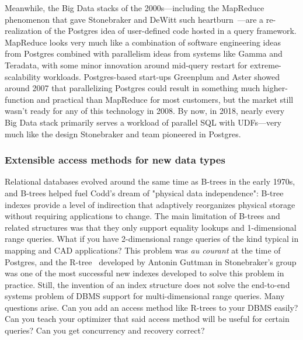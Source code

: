 \documentclass[sigconf,natbib=false]{acmart}
\begin{document}
Meanwhile, the Big Data stacks of the 2000s---including the MapReduce phenomenon that gave Stonebraker and DeWitt such heartburn~\cite{dewitt2008mapreduce}---are a re-realization of the Postgres idea of user-defined code hosted in a query framework. MapReduce looks very much like a combination of software engineering ideas from Postgres combined with parallelism ideas from systems like Gamma and Teradata, with some minor innovation around mid-query restart for extreme-scalability workloads. Postgres-based start-ups Greenplum and Aster showed around 2007 that parallelizing Postgres could result in something much higher-function and practical than MapReduce for most customers, but the market still wasn't ready for any of this technology in 2008. By now, in 2018, nearly every Big Data stack primarily serves a workload of parallel SQL with UDFs---very much like the design Stonebraker and team pioneered in Postgres.

\subsubsection{Extensible access methods for new data types}



Relational databases evolved around the same time as B-trees in the early 1970s, and B-trees helped fuel Codd's dream of "physical data independence": B-tree indexes provide a level of indirection that adaptively reorganizes physical storage without requiring applications to change. The main limitation of B-trees and related structures was that they only support equality lookups and 1-dimensional range queries. What if you have 2-dimensional range queries of the kind typical in mapping and CAD applications? This problem was \textit{au courant} at the time of Postgres, and the R-tree~\cite{Guttman:1984:RDI:602259.602266} developed by Antonin Guttman in Stonebraker's group was one of the most successful new indexes developed to solve this problem in practice. Still, the invention of an index structure does not solve the end-to-end systems problem of DBMS support for multi-dimensional range queries. Many questions arise. Can you add an access method like R-trees to your DBMS easily? Can you teach your optimizer that said access method will be useful for certain queries? Can you get concurrency and recovery correct?
\end{document}
